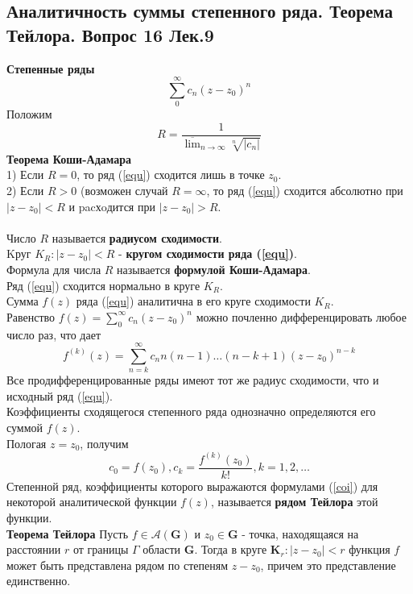 \documentclass{article}
\begin{document}
\subsection{Аналитичность суммы степенного ряда. Теорема Тейлора. Вопрос 16 Лек.9}
	\textbf{Степенные ряды} \\
	\begin{equation}
	\label{equ}
	\sum_{0}^{\infty}{c}_{n}{(z-{z}_{0})}^{n}
	\end{equation}
	Положим
	\begin{equation}
	R=\frac{1}{\overline{\lim}_{n\rightarrow \infty}\sqrt[n]{|{c}_{n}|}}
	\end{equation}
	\textbf{Теорема Коши-Адамара} \\
	1) Если $ R=0$, то ряд (\ref{equ}) сходится лишь в точке $z_{0} $.\\  
	2) Если $ R>0 $ (возможен случай $ R=\infty $, то ряд (\ref{equ}) сходится абсолютно при $ \left|z-z_{0}\right|<R $ и pacхoдится при $ \left|z-z_{0}\right|>R $.\\
	\\
	Число $ R $ называется \textbf{радиусом сходимости}. \\
	Kруг $ K_{R}:\left|z-z_{0}\right|<R$ - \textbf{кругом сходимости ряда (\ref{equ})}.\\
	Формула для числа $R $ называется \textbf{формулой Коши-Адамара}.\\
	Ряд (\ref{equ}) сходится нормально в круге $ K_{R} $.\\
	Сумма $ f(z)$ ряда (\ref{equ}) аналитична в его круге сходимости $ K_{R} $.\\
	Равенство $f(z)=\sum_{0}^{\infty}{c}_{n}{(z-{z}_{0})}^{n}$ можно почленно дифференцировать любое число раз, что дает
	\begin{equation}
	f^{(k)}(z)=\sum_{n=k}^{\infty} c_{n} n(n-1) \ldots(n-k+1)\left(z-z_{0}\right)^{n-k}
	\end{equation}
	Все продифференцированные ряды имеют тот же радиус сходимости, что и исходный ряд (\ref{equ}).\\
	Коэффициенты сходящегося степенного ряда однозначно определяются его суммой $f(z)$.\\
	Пологая $z={z}_{0}$, получим
	\begin{equation}
	\label{coi}
	{c}_{0}=f({z}_{0}),{c}_{k}=\frac{{f}^{(k)}({z}_{0})}{k!},k=1,2,\ldots
	\end{equation}
	Степенной ряд, коэффициенты которого выражаются формулами (\ref{coi}) для некоторой аналитической функции $ f(z)$,  называется \textbf{рядом Тейлора} этой функции.\\
	\textbf{Теорема Тейлора} Пусть $ f \in \mathcal{A}(\mathbf{G}) $ и $ z_{0} \in \mathbf{G}$ - точка, находящаяся на расстоянии $ r $ от границы $\Gamma$ области $\mathbf{G}$. Тогда в круге $ \mathbf{K}_{r}:\left|z-z_{0}\right|<r $ функция $ f $ может быть представлена рядом по степеням $ z-z_{0}$, причем это представление единственно.\\
\end{document}

